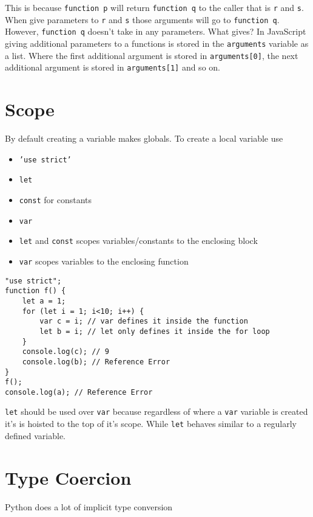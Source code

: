 \documentclass[../CMPUT-404-Notes.tex]{subfiles}
\begin{document}
This is because \texttt{function p} will return \texttt{function q} to the caller that is \texttt{r} and \texttt{s}. When give parameters to \texttt{r} and \texttt{s} those arguments will go to \texttt{function q}. 
However, \texttt{function q} doesn't take in any parameters. What gives?
In JavaScript giving additional parameters to a functions is stored in the \texttt{arguments} variable as a list. Where the first additional argument is stored in \texttt{arguments[0]}, the next additional argument is stored in \texttt{arguments[1]} and so on.

\section{Scope}
By default creating a variable makes globals.
To create a local variable use
\begin{itemize}
    \item \texttt{'use strict'}
    \item \texttt{let}
    \item \texttt{const} for constants 
    \item \texttt{var}
\end{itemize}

\begin{itemize}
    \item \texttt{let} and \texttt{const} scopes variables/constants to the enclosing block
    \item \texttt{var} scopes variables to the enclosing function
\end{itemize}
\begin{verbatim}
"use strict";
function f() {
    let a = 1;
    for (let i = 1; i<10; i++) {
        var c = i; // var defines it inside the function
        let b = i; // let only defines it inside the for loop
    }
    console.log(c); // 9
    console.log(b); // Reference Error
}
f();
console.log(a); // Reference Error
\end{verbatim}

\begin{Note}
    \texttt{let} should be used over \texttt{var} because regardless of where a \texttt{var} variable is created it's is hoisted to the top of it's scope. While \texttt{let} behaves similar to a regularly defined variable.
\end{Note}

\section{Type Coercion} 
Python does a lot of implicit type conversion
\end{document}
